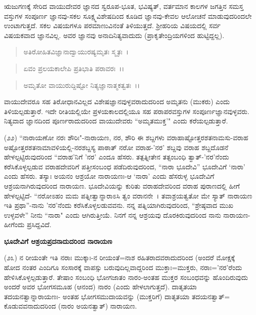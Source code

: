 
ಋಜುಗಣಕ್ಕೆ ಸೇರಿದ ವಾಯುದೇವರ ಜ್ಞಾನದ ಸ್ವರೂಪ-ಭೂತ, ಭವಿಷ್ಯತ್, ವರ್ತಮಾನ ಕಾಲಗಳ ಜಗತ್ತಿನ ಸಮಸ್ತ ವಸ್ತುಗಳ ಸಂಪೂರ್ಣ ಜ್ಞಾನವು-ಸಕಲ ಸೂಕ್ಷ್ಮವಿಶೇಷದಿಂದ ಕೂಡಿದ ಜ್ಞಾನವು-ಕೇವಲ ಆಲೋಚನೆ ಮಾಡುವುದರಿಂದಲೇ ಉಂಟಾಗುತ್ತದೆ. ಸಕಲ ವಿಷಯಗಳೂ ಪರಮಾಣುವಿನಂತೆ ತಿಳಿಯುತ್ತದೆ. ಶ‍್ರೀಹರಿಯ ವಿಷಯದಲ್ಲಿ ಸರ್ವ ವಿಷಯಕವಾದ ಜ್ಞಾನವಿಲ್ಲ. ಅವರ ಜ್ಞಾನವು ಅನಾದಿನಿತ್ಯವಾದುದು (ಪ್ರಾಕೃತೇಂದ್ರಿಯಗಳಿಂದ ಹುಟ್ಟಿದ್ದಲ್ಲ).

\begin{verse}
ಅತಿರೋಹಿತವಿಜ್ಞಾನಾದ್ವಾಯುರಷ್ಯಮೃತಃ ಸ್ಮೃತಃ~।
\end{verse}


\begin{verse}
ಏವಂ ಪ್ರಲಯಕಾಲೇಪಿ ಪ್ರತಿಭಾತಿ ಪರಾವರಃ~।।
\end{verse}


\begin{verse}
ಅಮೃತೋ ವಾಯುರುದ್ದಿಷ್ಟೋ ನಿತ್ಯಜ್ಞಾನಾತ್ಮಕತ್ವತಃ~।।
\end{verse}


\noindent
ವಾಯುದೇವರೂ ಸಹ ತಿರೋಧಾನವಿಲ್ಲದ ವಿಶೇಷಜ್ಞಾನವುಳ್ಳವರಾದುದರಿಂದ ಅಮೃತನು (ಮುಕರು) ಎಂದು ತಿಳಿಯಲ್ಪಡುತ್ತಾರೆ. ಇದೇ ರೀತಿಯಲ್ಲಿಯೇ ಪ್ರಳಯಕಾಲದಲ್ಲಿಯೂ ಸಹ ಪರಾಪರವಸ್ತುಗಳ ಸಂಪೂರ್ಣಜ್ಞಾನವುಳ್ಳವರು. ನಿತ್ಯವಾದ ಜ್ಞಾನದಿಂದ ಪೂರ್ಣರಾದುದರಿಂದ ವಾಯುದೇವರು ``ಅಮೃತಮುಕ್ತ'" ಎಂದು ಕರೆಯಲ್ಪಡುತ್ತಾರೆ.

(೨೨) ``ನಾರಾಯಣೋ ನರಃ ಶೌರಿಃ"-ನಾರಾಯಣ, ನರ, ಶೌರಿ ಈ ಶಬ್ದಗಳು ವರಾಹಾಷ್ಟೋತ್ತರಶತನಾಮಸು-ವರಾಹ ಅಷ್ಟೋತ್ತರಶತನಾಮಾವಳಿಯಲ್ಲಿ-ನರಶಬ್ದಸ್ಯ ಪಾಠಾತ್ ನರೋ ವರಾಹ-'ನರ' ಶಬ್ದವು ವರಾಹ ಶಬ್ದದೊಡನೆ ಹೇಳಲ್ಪಟ್ಟಿರುವುದರಿಂದ “ವರಾಹ'ನಿಗೆ 'ನರ' ಎಂದೂ ಹೆಸರು. ತತ್ಪತ್ನೀತೇನ ತತ್ಸಂಬಂಧಿ ತ್ವಾತ್-'ನರ'ನೆಂದು ಕರೆಸಿಕೊಳ್ಳಲ್ಪಡುವ ವರಾಹದೇವರಿಗೆ ಪತ್ತೀಸಂಬಂಧ ಪಡೆದಿರುವುದರಿಂದ, ``ನಾರಾ ಭೂದೇವಿ'' ಭೂದೇವಿಗೆ `ನಾರಾ' ಎಂದು ಹೆಸರು. ತಸ್ಯಾಃ ಅಯನಂ ಆಶ್ರಯೋ ನಾರಾಯಣಃ-ಆ `ನಾರಾ' ಎಂದು ಹೆಸರುಳ್ಳ ಭೂದೇವಿಗೆ ಆಶ್ರಯನಾಗಿರುವುದರಿಂದ ನಾರಾಯಣ. ಭೂದೇವಿಯನ್ನು ಕುರಿತು ವರಾಹದೇವರಿಂದ ವರಾಹ ಪುರಾಣದಲ್ಲಿ ಹೀಗೆ ಹೇಳಲ್ಪಟ್ಟಿದೆ- ``ನರೋಽಹಂ ಮಮ ಪತ್ನೀತ್ವಾನ್ನಾರಾಽಸಿ ತ್ವಂ ವರಾನನೇ~। ತವಾಶ್ರಯತ್ವತೋ ಮೇ ಸ್ಯಾತ್ ನಾರಾಯಣ ಇತಿ ಪ್ರಥಾ''-ನಾನು 'ನರ'ನೆಂದು ಕರೆಸಿಕೊಳ್ಳಲಡುವವನು. ನನ್ನ ಪತ್ನಿಯಾಗಿರುವುದರಿಂದ, ``ಶ್ರೇಷ್ಠವಾದ ಮುಖ ಉಳ್ಳವಳೇ'' ನೀನು ``ನಾರಾ" ಎಂದು ಆಗಿರುತ್ತೀಯೆ. ನಿನಗೆ ನನ್ನ ಆಶ್ರಯವು ದೊರಕಿರುವುದರಿಂದ ನಾನು ನಾರಾಯಣ- ಹೀಗೆಂದು ಪ್ರಸಿದ್ದವಿದೆ.

\begin{center}
\textbf{ಭೂದೇವಿಗೆ ಆಶ್ರಯಪ್ರದನಾದುದರಿಂದ ನಾರಾಯಣ}
\end{center}

(೨೩) ನ ರೀಯಂತೇ ಇತಿ ನರಾಃ ಮುಕ್ಕಾಃ-ನ ರೀಯಂತೆ=ನಾಶ ರಹಿತರಾದವರಾದುದರಿಂದ (ಅಂದರೆ ಮೋಕ್ಷಕ್ಕೆ ಹೋದ ನಂತರ ಎಂದಿಗೂ ಸಂಸಾರಕ್ಕೆ ವಾಪಸ್ಸು ಬರುವುದಿಲ್ಲವಾದ್ದರಿಂದ ಮುಕ್ತಾಃ=ಮುಕ್ತರು, ನರಾಃ='ನರ'ರೆಂದು ಹೇಳಿಸಿಕೊಳ್ಳಲ್ಪಡುತ್ತಾರೆ. ತೇಷಾಂ ಸಂಬಂಧಿ ಭೋಗಜಾತಂ ನಾರಂ-ಅಂತಹ ಮುಕ್ತರ ಸಂಬಂಧವನ್ನು ಹೊಂದಿರುವುದು ಅಂದರೆ ಅವರ ಭೋಗಸಮೂಹ (ಆನಂದ) ನಾರಂ (ಎಂದು ಹೇಳಲಾಗುತ್ತದೆ). ದಾತೃತಯಾ ತದಯನತ್ವಾನ್ನಾರಾಯಣಃ- ಅಂತಹ ಭೋಗಸಮುದಾಯವನ್ನು (ಮುಕ್ತರಿಗೆ) ದಾತೃತಯಾ ತದಯನತ್ವಾತ್= ಕೊಡುವವನಾದುದರಿಂದ (ನಾರಂ ಅಯನತ್ವಾತ್) ನಾರಾಯಣ.

